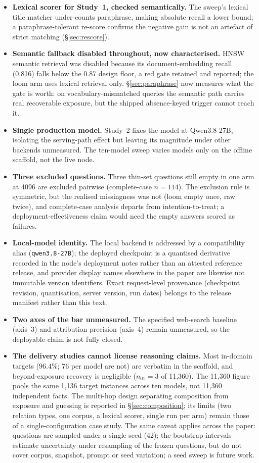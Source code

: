 \documentclass[10pt,twocolumn]{article}
\begin{document}
\begin{itemize}[topsep=2pt,itemsep=2pt,leftmargin=1.4em]
\item \textbf{Lexical scorer for Study~1, checked semantically.} The sweep's lexical title matcher under-counts paraphrase, making absolute recall a lower bound; a paraphrase-tolerant re-score confirms the negative gain is not an artefact of strict matching (\S\ref{sec:rescore}).
\item \textbf{Semantic fallback disabled throughout, now characterised.} HNSW semantic retrieval was disabled because its document-embedding recall (0.816) falls below the 0.87 design floor, a red gate retained and reported; the loom arm uses lexical retrieval only. \S\ref{sec:paraphrase} now measures what the gate is worth: on vocabulary-mismatched queries the semantic path carries real recoverable exposure, but the shipped absence-keyed trigger cannot reach it.
\item \textbf{Single production model.} Study~2 fixes the model at Qwen3.8-27B, isolating the serving-path effect but leaving its magnitude under other backends unmeasured. The ten-model sweep varies models only on the offline scaffold, not the live node.
\item \textbf{Three excluded questions.} Three thin-set questions still empty in one arm at 4096 are excluded pairwise (complete-case $n=114$). The exclusion rule is symmetric, but the realised missingness was not (loom empty once, raw twice), and complete-case analysis departs from intention-to-treat; a deployment-effectiveness claim would need the empty answers scored as failures.
\item \textbf{Local-model identity.} The local backend is addressed by a compatibility alias (\texttt{qwen3.8-27B}); the deployed checkpoint is a quantised derivative recorded in the node's deployment notes rather than an attested reference release, and provider display names elsewhere in the paper are likewise not immutable version identifiers. Exact request-level provenance (checkpoint revision, quantisation, server version, run dates) belongs to the release manifest rather than this text.
\item \textbf{Two axes of the bar unmeasured.} The specified web-search baseline (axis~3) and attribution precision (axis~4) remain unmeasured, so the deployable claim is not fully closed.
\item \textbf{The delivery studies cannot license reasoning claims.} Most in-domain targets ($96.4\%$; 76 per model are not) are verbatim in the scaffold, and beyond-exposure recovery is negligible ($n_{01}=3$ of 11{,}360). The 11{,}360 figure pools the same 1{,}136 target instances across ten models, not 11{,}360 independent facts. The multi-hop design separating composition from exposure and guessing is reported in \S\ref{sec:composition}; its limits (two relation types, one corpus, a lexical scorer, single run per arm) remain those of a single-configuration case study. The same caveat applies across the paper: questions are sampled under a single seed (42); the bootstrap intervals estimate uncertainty under resampling of the frozen questions, but do not cover corpus, snapshot, prompt or seed variation; a seed sweep is future work.

\end{itemize}
\end{document}
